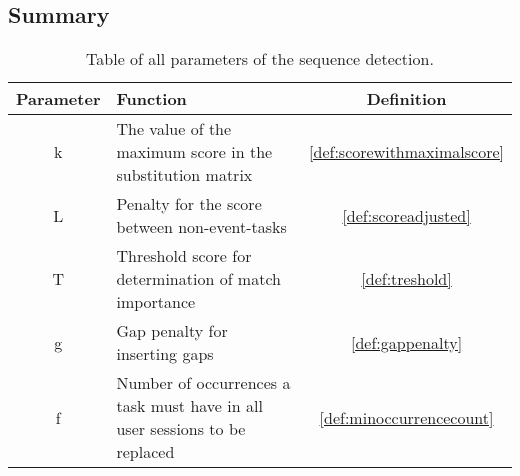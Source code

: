 
\subsection{Summary}
\begin{table}
	\begin{tabularx}{\textwidth}{|c|X|c|}
	   \hline
	     Parameter & Function & Definition \\
	     \hline
	       k & The value of the maximum score in the substitution matrix& \ref{def:scorewithmaximalscore} \\
	       L & Penalty for the score between non-event-tasks & \ref{def:scoreadjusted} \\
	       T & Threshold score for determination of match importance & \ref{def:treshold} \\
	       g & Gap penalty for inserting gaps & \ref{def:gappenalty} \\
	       f & Number of occurrences a task must have in all user sessions to be replaced & \ref{def:minoccurrencecount} \\
	       \hline
 \end{tabularx}
 \caption{Table of all parameters of the sequence detection.}
 \label{tab:parameters}
 \end{table}
